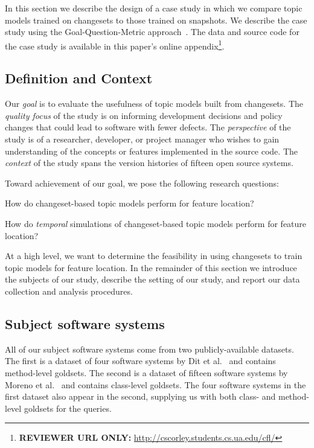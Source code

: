 
In this section we describe the design of a case study in which we
compare topic models trained on changesets to those trained on snapshots.
We describe the case study using the Goal-Question-Metric approach~\cite{Basili-etal:94}.
The data and source code for the case study is available in this paper's online
appendix\footnote{\textbf{REVIEWER URL ONLY:} \url{http://cscorley.students.cs.ua.edu/cfl/}}.

\subsection{Definition and Context}

Our \textit{goal} is to evaluate the usefulness of topic models built
from changesets.
The \textit{quality focus} of the study is on informing development
decisions and policy changes that could lead to software with fewer
defects.
The \textit{perspective} of the study is of a researcher, developer, or
project manager who wishes to gain understanding of the concepts or
features implemented in the source code.
The \textit{context} of the study spans the version histories of fifteen
open source systems.

Toward achievement of our goal, we pose the following research questions:
\begin{description}[font=\itshape\mdseries,leftmargin=10mm,style=sameline]
    \item[RQ1] How do changeset-based topic models perform for feature location?
    \item[RQ2] How do \emph{temporal} simulations of changeset-based topic models perform for feature location?
\end{description}
At a high level, we want to determine the feasibility in using changesets
to train topic models for feature location.
In the remainder of this section we introduce the subjects of our study,
describe the setting of our study, and report our data collection and analysis procedures.


\subsection{Subject software systems}

All of our subject software systems come from two publicly-available
datasets.  The first is a dataset of four software systems by Dit et
al.~\cite{Dit:2013} and contains method-level goldsets.  The second is
a dataset of fifteen software systems by Moreno et
al.~\cite{Moreno:2014} and contains class-level goldsets. The four
software systems in the first dataset also appear in the second,
supplying us with both class- and method-level goldsets for the queries.

